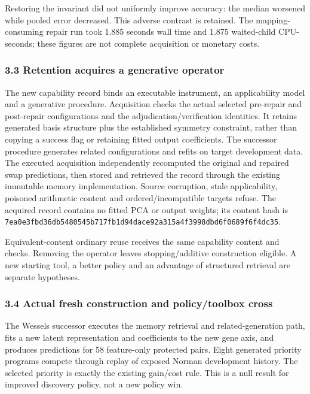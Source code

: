 \documentclass[
  10pt,
]{article}
\begin{document}
Restoring the invariant did not uniformly improve accuracy: the median
worsened while pooled error decreased. This adverse contrast is
retained. The mapping-consuming repair run took 1.885 seconds wall time
and 1.875 waited-child CPU-seconds; these figures are not complete
acquisition or monetary costs.

\hypertarget{retention-acquires-a-generative-operator}{%
\subsubsection{3.3 Retention acquires a generative
operator}\label{retention-acquires-a-generative-operator}}

The new capability record binds an executable instrument, an
applicability model and a generative procedure. Acquisition checks the
actual selected pre-repair and post-repair configurations and the
adjudication/verification identities. It retains generated basis
structure plus the established symmetry constraint, rather than copying
a success flag or retaining fitted output coefficients. The successor
procedure generates related configurations and refits on target
development data. The executed acquisition independently recomputed the
original and repaired swap predictions, then stored and retrieved the
record through the existing immutable memory implementation. Source
corruption, stale applicability, poisoned arithmetic content and
ordered/incompatible targets refuse. The acquired record contains no
fitted PCA or output weights; its content hash is
\nolinkurl{7ea0e3fbd36db5480545b717fb1d94dace92a315a4f3998dbd6f0689f6f4dc35}.

Equivalent-content ordinary reuse receives the same capability content
and checks. Removing the operator leaves stopping/additive construction
eligible. A new starting tool, a better policy and an advantage of
structured retrieval are separate hypotheses.

\hypertarget{actual-fresh-construction-and-policytoolbox-cross}{%
\subsubsection{3.4 Actual fresh construction and policy/toolbox
cross}\label{actual-fresh-construction-and-policytoolbox-cross}}

The Wessels successor executes the memory retrieval and
related-generation path, fits a new latent representation and
coefficients to the new gene axis, and produces predictions for 58
feature-only protected pairs. Eight generated priority programs compete
through replay of exposed Norman development history. The selected
priority is exactly the existing gain/cost rule. This is a null result
for improved discovery policy, not a new policy win.
\end{document}
